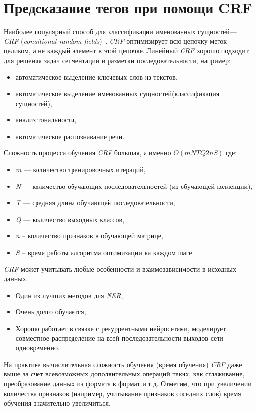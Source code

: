 \documentclass{csmathnotes}
\begin{document}
\section*{Предсказание тегов при помощи CRF}
Наиболее  популярный способ для классификации именованных сущностей— \emph{CRF} (\emph{conditional random fields})~\cite{HabrCRF}. \emph{CRF} оптимизирует всю цепочку меток целиком, а не каждый элемент в этой цепочке.  Линейный \emph{CRF} хорошо подходит для решения задач сегментации и разметки последовательности, например:
\begin{itemize}
    \item автоматическое выделение ключевых слов из текстов,
    \item автоматическое выделение именованных сущностей(классификация сущностей),
    \item анализ тональности,
    \item автоматическое распознавание речи.
\end{itemize}


Сложность процесса обучения \emph{CRF} большая, а именно $O(mNTQ2nS)$ где:
\begin{itemize}
    \item \emph{m} — количество тренировочных итераций,
    \item \emph{N} — количество обучающих последовательностей (из обучающей коллекции),
    \item \emph{T} — средняя длина обучающей последовательности,
    \item \emph{Q} — количество выходных классов,
    \item \emph{n} – количество признаков в обучающей матрице,
    \item \emph{S} – время работы алгоритма оптимизации на каждом шаге. 
\end{itemize}


\emph{CRF} может учитывать любые особенности и взаимозависимости в исходных данных.
\begin{itemize}
    \item Один из лучших методов для \emph{NER},
    \item Очень долго обучается,
    \item Хорошо работает в связке с рекуррентными нейросетями, моделирует совместное распределение на всей последовательности выходов сети одновременно.
\end{itemize}

На практике вычислительная сложность обучения (время обучения) \emph{CRF} даже выше за счет всевозможных дополнительных операций таких, как сглаживание, преобразование данных из формата в формат и т.д. Отметим, что при увеличении количества признаков (например, учитывание признаков соседних слов) время обучения значительно увеличиться. 
\end{document}
